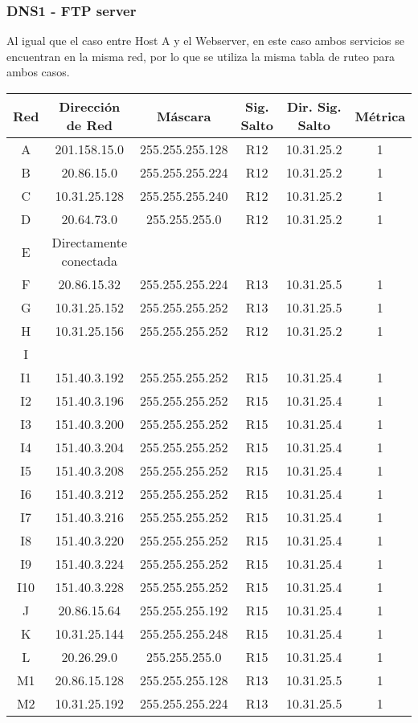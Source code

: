 \subsubsection{DNS1 - FTP server}
Al igual que el caso entre Host A y el Webserver, en este caso ambos servicios se encuentran en la misma red, por lo que se utiliza la misma tabla de ruteo para ambos casos.
\begin{tabular}{|c|c|c|c|c|c|}
	\hline
	Red & Dirección de Red & Máscara & Sig. Salto & Dir. Sig. Salto & Métrica \\
	\hline
	A & 201.158.15.0  & 255.255.255.128 & R12 & 10.31.25.2 & 1\\
	\hline	
	B & 20.86.15.0 & 255.255.255.224 & R12 & 10.31.25.2 & 1\\
	\hline
	C & 10.31.25.128 & 255.255.255.240 & R12 & 10.31.25.2 & 1\\
	\hline
	D & 20.64.73.0 & 255.255.255.0 & R12 & 10.31.25.2 & 1\\
	\hline
	E & Directamente conectada &&&&\\
	\hline
	F & 20.86.15.32 & 255.255.255.224 & R13 & 10.31.25.5 & 1\\
	\hline
	G & 10.31.25.152 & 255.255.255.252 & R13 & 10.31.25.5 & 1\\
	\hline
	H & 10.31.25.156 & 255.255.255.252 & R12 & 10.31.25.2 & 1\\
	\hline
	I &  & & & &\\
	I1 & 151.40.3.192 & 255.255.255.252 & R15 & 10.31.25.4 & 1 \\
	I2 & 151.40.3.196 & 255.255.255.252 & R15 & 10.31.25.4 & 1 \\
 	I3 & 151.40.3.200 & 255.255.255.252 & R15 & 10.31.25.4 & 1 \\
 	I4 & 151.40.3.204 & 255.255.255.252 & R15 & 10.31.25.4 & 1 \\
 	I5 & 151.40.3.208 & 255.255.255.252 & R15 & 10.31.25.4 & 1 \\
 	I6 & 151.40.3.212 & 255.255.255.252 & R15 & 10.31.25.4 & 1 \\
 	I7 & 151.40.3.216 & 255.255.255.252 & R15 & 10.31.25.4 & 1 \\
 	I8 & 151.40.3.220 & 255.255.255.252 & R15 & 10.31.25.4 & 1 \\
 	I9 & 151.40.3.224 & 255.255.255.252 & R15 & 10.31.25.4 & 1 \\
 	I10 & 151.40.3.228 & 255.255.255.252 & R15 & 10.31.25.4 & 1 \\
	\hline
	J & 20.86.15.64 & 255.255.255.192 & R15 & 10.31.25.4 & 1\\
 	\hline
	K & 10.31.25.144 & 255.255.255.248 & R15 & 10.31.25.4 & 1\\
 	\hline
	L & 20.26.29.0 & 255.255.255.0 & R15 & 10.31.25.4 & 1\\
	\hline
	M1 & 20.86.15.128 & 255.255.255.128 & R13 & 10.31.25.5 & 1\\
	\hline
	M2 & 10.31.25.192 & 255.255.255.224 & R13 & 10.31.25.5 & 1\\
	\hline
\end{tabular}

